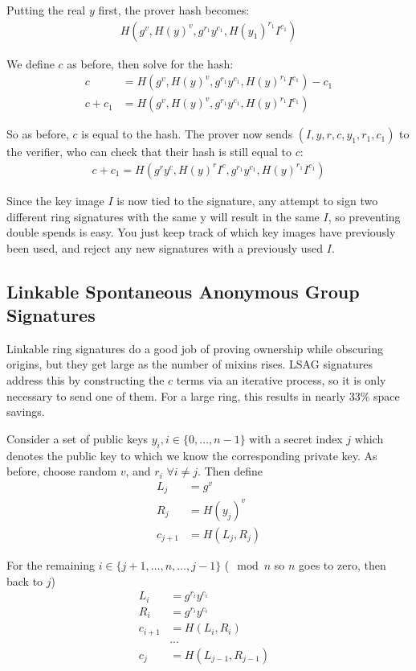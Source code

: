 \documentclass{article}
\begin{document}
Putting the real $y$ first, the prover hash becomes:
\begin{align}
  H(g^v, H(y)^v, g^{r_1} y^{c_1}, H(y_1)^{r_1} I^{c_1})
\end{align}

We define $c$ as before, then solve for the hash:
\begin{align}
  c &= H(g^v, H(y)^v, g^{r_1} y^{c_1}, H(y)^{r_1} I^{c_1}) - c_1\\
  c + c_1 &= H(g^v, H(y)^v, g^{r_1} y^{c_1}, H(y)^{r_1} I^{c_1})
\end{align}

So as before, $c$ is equal to the hash.  The prover now sends $(I, y, r, c, y_1, r_1, c_1)$ to the verifier, who can check that their hash is still equal to $c$:
\begin{align}
  c + c_1 = H(g^r y^c, H(y)^r I^c, g^{r_1} y^{c_1}, H(y)^{r_1} I^{c_1})
\end{align}

Since the key image $I$ is now tied to the signature, any attempt to sign two different ring signatures with the same y will result in the same $I$, so preventing double spends is easy.  You just keep track of which key images have previously been used, and reject any new signatures with a previously used $I$.


\subsection{Linkable Spontaneous Anonymous Group Signatures}

Linkable ring signatures do a good job of proving ownership while obscuring origins, but they get large as the number of mixins rises. LSAG signatures address this by constructing the $c$ terms via an iterative process, so it is only necessary to send one of them.  For a large ring, this results in nearly 33\% space savings.

Consider a set of public keys $y_i, i \in \{0, …, n-1\}$ with a secret index $j$ which denotes the public key to which we know the corresponding private key.  As before, choose random $v$, and $r_i$ $\forall i \ne j$.  Then define
\begin{align}
      L_j &= g^v\\
      R_j &= H(y_j)^v\\
  c_{j+1} &= H(L_j,R_j)
\end{align}

For the remaining $i \in \{j+1, …, n, …, j-1\}$ ($\mod{n}$ so $n$ goes to zero, then back to $j$)
\begin{align}
  L_i &= g^{r_i} y^{c_i}\\
  R_i &= g^{r_i} y^{c_i}\\
  c_{i+1} &= H(L_i,R_i)\\
  &...& \\
  c_j &= H(L_{j-1}, R_{j-1})
\end{align}
\end{document}
